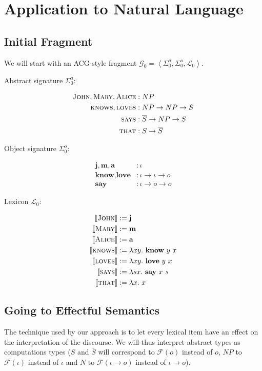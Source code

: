\documentclass{article}
\newcommand{\abs}[1]{\textsc{#1}}
\newcommand{\obj}[1]{\textbf{#1}}
\newcommand{\sem}[1]{\llbracket #1 \rrbracket}
\newcommand{\lex}[2]{\sem{\abs{#1}} &:= #2}
\begin{document}
\section{Application to Natural Language}

\subsection{Initial Fragment}

We will start with an ACG-style fragment $\mathcal{G}_0 = \left<
\Sigma^a_0, \Sigma^o_0, \mathcal{L}_0 \right>$.

Abstract signature $\Sigma^a_0$:

\begin{align*}
  \abs{John}, \abs{Mary}, \abs{Alice} &: NP \\
  \abs{knows}, \abs{loves} &: NP \to NP \to S \\
  \abs{says} &: \overline{S} \to NP \to S \\
  \abs{that} &: S \to \overline{S} \\
\end{align*}

Object signature $\Sigma^o_0$:

\begin{align*}
  \obj{j}, \obj{m}, \obj{a} &: \iota \\
  \obj{know}, \obj{love} &: \iota \to \iota \to o \\
  \obj{say} &: \iota \to o \to o
\end{align*}

Lexicon $\mathcal{L}_0$:

\begin{align*}
  \lex{John}{\obj{j}} \\
  \lex{Mary}{\obj{m}} \\
  \lex{Alice}{\obj{a}} \\
  \lex{knows}{\lambda x y.\ \obj{know}\ y\ x} \\
  \lex{loves}{\lambda x y.\ \obj{love}\ y\ x} \\
  \lex{says}{\lambda s x.\ \obj{say}\ x\ s} \\
  \lex{that}{\lambda x.\ x}
\end{align*}


\subsection{Going to Effectful Semantics}

The technique used by our approach is to let every lexical item have an
effect on the interpretation of the discourse. We will thus interpret
abstract types as computations types ($S$ and $\overline{S}$ will
correspond to $\mathcal{F}(o)$ instead of $o$, $NP$ to $\mathcal{F}(\iota)$
instead of $\iota$ and $N$ to $\mathcal{F}(\iota \to o)$ instead of $\iota
\to o$).
\end{document}
